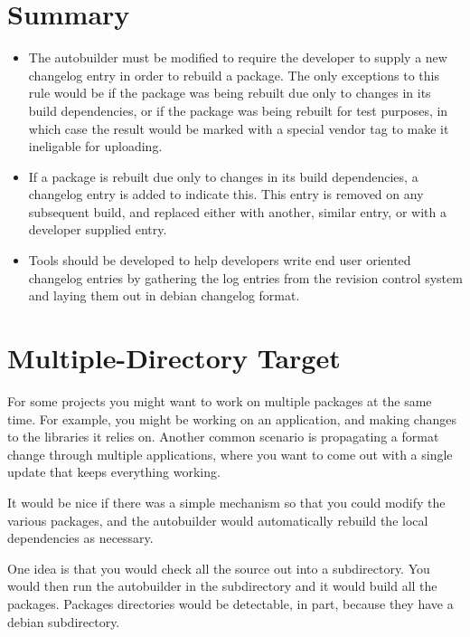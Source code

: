 \documentclass[12pt]{article}
\begin{document}
\section{Summary}

\begin{itemize}

\item The autobuilder must be modified to require the developer to
supply a new changelog entry in order to rebuild a package.  The only
exceptions to this rule would be if the package was being rebuilt due
only to changes in its build dependencies, or if the package was being
rebuilt for test purposes, in which case the result would be marked
with a special vendor tag to make it ineligable for uploading.

\item If a package is rebuilt due only to changes in its build
dependencies, a changelog entry is added to indicate this.  This entry
is removed on any subsequent build, and replaced either with another,
similar entry, or with a developer supplied entry.

\item Tools should be developed to help developers write end user
oriented changelog entries by gathering the log entries from the
revision control system and laying them out in debian changelog
format.

\end{itemize}



\section{Multiple-Directory Target}

For some projects you might want to work on multiple packages at the
same time. For example, you might be working on an application, and
making changes to the libraries it relies on.  Another common scenario
is propagating a format change through multiple applications, where
you want to come out with a single update that keeps everything working.

It would be nice if there was a simple mechanism so that you could
modify the various packages, and the autobuilder would automatically
rebuild the local dependencies as necessary.

One idea is that you would check all the source out into a
subdirectory. You would then run the autobuilder in the subdirectory
and it would build all the packages. Packages directories would be
detectable, in part, because they have a debian subdirectory.
\end{document}
